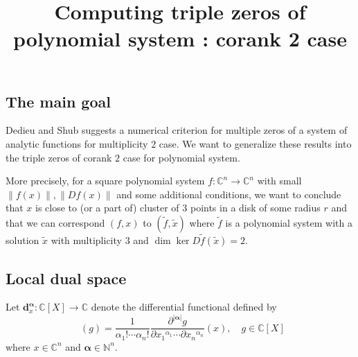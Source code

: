 \documentclass[12pt,oneside,reqno]{amsart}
\title{Computing triple zeros of polynomial system : corank 2 case}
\theoremstyle{definition}
\DeclareMathOperator{\diffop}{\mathbf{d}^\mathbf{\alpha}_x}
\begin{document}
\maketitle
\subsection{The main goal}
Dedieu and Shub \cite{dedieu2001simple} suggests a numerical criterion for multiple zeros of a system of analytic functions for multiplicity $2$ case. We want to generalize these results into the triple zeros of corank $2$ case for polynomial system.

More precisely, for a square polynomial system $f:\mathbb{C}^n\rightarrow \mathbb{C}^n$ with small $\|f(x)\|,\|Df(x)\|$ and some additional conditions, we want to conclude that $x$ is close to (or a part of) cluster of $3$ points in a disk of some radius $r$ and that we can correspond $(f,x)$ to $(\tilde{f},\tilde{x})$ where $\tilde{f}$ is a polynomial system with a solution $\tilde{x}$ with multiplicity $3$ and $\dim\ker D\tilde{f}(\tilde{x})=2$.

\subsection{Local dual space}
Let $\mathbf{d}^\mathbf{\alpha}_x :\mathbb{C}[X]\rightarrow \mathbb{C}$ denote the differential functional defined by
\[\diffop(g)=\frac{1}{\alpha_1!\cdots \alpha_n!}\frac{\partial^{|\mathbf{\alpha}|}g}{\partial {x_1}^{\alpha_1}\cdots \partial{x_n}^{\alpha_n}}(x), \quad g\in \mathbb{C}[X]\]
where $x\in \mathbb{C}^n$ and $\mathbf{\alpha}\in \mathbb{N}^n$.
\end{document}
